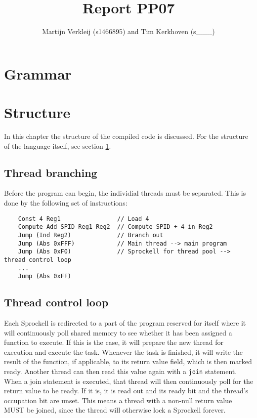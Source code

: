 \documentclass[10pt,a4paper]{report}
\author{Martijn Verkleij (s1466895) and Tim Kerkhoven (s$\_\_\_\_\_\_\_$)}
\title{Report PP07}
\begin{document}
\maketitle
\tableofcontents

\chapter{Grammar} \label{Grammar}

\chapter{Structure} \label{Structure}
In this chapter the structure of the compiled code is discussed. For the structure of the language itself, see section \ref{Grammar}. 
\section{Thread branching}
Before the program can begin, the individial threads must be separated. This is done by the following set of instructions:
\begin{verbatim}
	Const 4 Reg1				// Load 4
	Compute Add SPID Reg1 Reg2	// Compute SPID + 4 in Reg2
	Jump (Ind Reg2)				// Branch out
	Jump (Abs 0xFFF)			// Main thread --> main program
	Jump (Abs 0xF0)				// Sprockell for thread pool --> thread control loop
	...
	Jump (Abs 0xFF)
\end{verbatim}

\section{Thread control loop}
Each Sprockell is redirected to a part of the program reserved for itself where it will continuously poll shared memory to see whether it has been assigned a function to execute. If this is the case, it will prepare the new thread for execution and execute the task. Whenever the task is finished, it will write the result of the function, if applicable, to its return value field, which is then marked ready. Another thread can then read this value again with a \texttt{join} statement. When a join statement is executed, that thread will then continuously poll for the return value to be ready. If it is, it is read out and its ready bit and the thread's occupation bit are unset. This means a thread with a non-null return value MUST be joined, since the thread will otherwise lock a Sprockell forever. 
\end{document}
